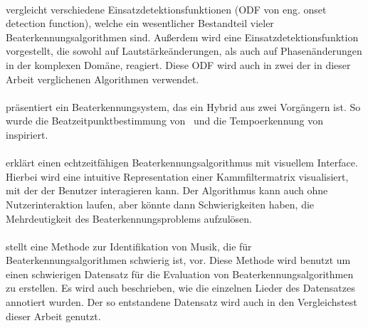 \paragraph{\cite{2004_BeDaDuSa}}
{
	vergleicht verschiedene Einsatzdetektionsfunktionen (ODF von eng. onset detection function),
		welche ein wesentlicher Bestandteil vieler Beaterkennungsalgorithmen sind.
	Außerdem wird eine Einsatzdetektionsfunktion vorgestellt,
		die sowohl auf Lautstärkeänderungen,
		als auch auf Phasenänderungen in der komplexen Domäne,
		reagiert.
	Diese ODF wird auch in zwei der in dieser Arbeit verglichenen Algorithmen verwendet.
}

\paragraph{\cite{2009_DaPlSt}}
{
	präsentiert ein Beaterkennungsystem,
		das ein Hybrid aus zwei Vorgängern ist.
	So wurde die Beatzeitpunktbestimmung von~\cite{2007_El}
		und die Tempoerkennung von~\cite{2007_DaPl} inspiriert.
}

\paragraph{\cite{2011_PlRoSt}}
{
	erklärt einen echtzeitfähigen Beaterkennungsalgorithmus mit visuellem Interface.
	Hierbei wird eine intuitive Representation einer Kammfiltermatrix visualisiert,
		mit der der Benutzer interagieren kann.
	Der Algorithmus kann auch ohne Nutzerinteraktion laufen,
		aber könnte dann Schwierigkeiten haben,
		die Mehrdeutigkeit des Beaterkennungsproblems aufzulösen.
}


\paragraph{\cite{2012_HoDaZaOlGo}}
{
	stellt eine Methode zur Identifikation von Musik,
		die für Beaterkennungsalgorithmen schwierig ist,
		vor.
	Diese Methode wird benutzt um einen schwierigen Datensatz für die Evaluation von Beaterkennungsalgorithmen zu erstellen.
	Es wird auch beschrieben,
		wie die einzelnen Lieder des Datensatzes annotiert wurden.
	Der so entstandene Datensatz wird auch in den Vergleichstest dieser Arbeit genutzt.
}
